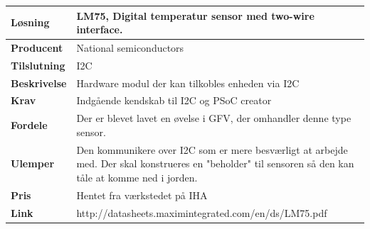 

\begin{table}[!htbp] \centering	
	\label{fu:Temperatursensor}
\begin{tabular}{|p{6cm}|p{8cm}|}
	\hline
		\textbf{Løsning}				&LM75, Digital temperatur sensor med two-wire interface. 			\\\hline %
		\textbf{Producent} 			&National semiconductors			\\\hline 
		\textbf{Tilslutning} 		&I2C 			\\\hline 
		\textbf{Beskrivelse} 		&Hardware modul der kan tilkobles enheden via I2C 			\\\hline 
		\textbf{Krav} 				&Indgående kendskab til I2C og PSoC creator 			\\\hline 
		\textbf{Fordele}			&Der er blevet lavet en øvelse i GFV, der omhandler denne type sensor. 			\\\hline 
		\textbf{Ulemper} 			&Den kommunikere over I2C som er mere besværligt at arbejde med. Der skal konstrueres en "beholder" til sensoren så den kan tåle at komme ned i jorden. 			\\\hline 
		\textbf{Pris} 				&Hentet fra værkstedet på IHA			\\\hline
		\textbf{Link} 				&http://datasheets.maximintegrated.com/en/ds/LM75.pdf			\\\hline	
	

\end{tabular}
\end{table}
